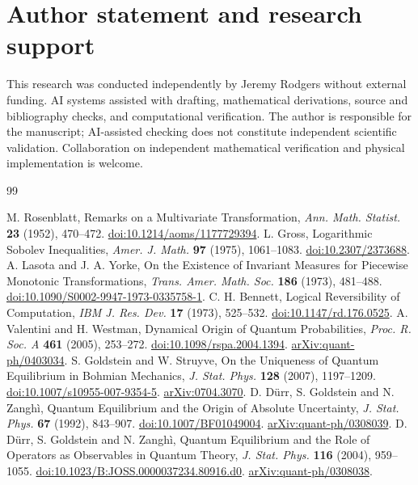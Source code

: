 \documentclass[11pt]{article}
\numberwithin{equation}{section}
\theoremstyle{definition}
\theoremstyle{remark}
\begin{document}
\section*{Author statement and research support}
This research was conducted independently by Jeremy Rodgers without external funding. AI systems assisted with drafting, mathematical derivations, source and bibliography checks, and computational verification. The author is responsible for the manuscript; AI-assisted checking does not constitute independent scientific validation. Collaboration on independent mathematical verification and physical implementation is welcome.

\begin{thebibliography}{99}
\raggedright
{} M. Rosenblatt, Remarks on a Multivariate Transformation, \emph{Ann. Math. Statist.} \textbf{23} (1952), 470--472. \href{https://doi.org/10.1214/aoms/1177729394}{doi:10.1214/aoms/1177729394}.
 L. Gross, Logarithmic Sobolev Inequalities, \emph{Amer. J. Math.} \textbf{97} (1975), 1061--1083. \href{https://doi.org/10.2307/2373688}{doi:10.2307/2373688}.
 A. Lasota and J. A. Yorke, On the Existence of Invariant Measures for Piecewise Monotonic Transformations, \emph{Trans. Amer. Math. Soc.} \textbf{186} (1973), 481--488. \href{https://doi.org/10.1090/S0002-9947-1973-0335758-1}{doi:10.1090/S0002-9947-1973-0335758-1}.
 C. H. Bennett, Logical Reversibility of Computation, \emph{IBM J. Res. Dev.} \textbf{17} (1973), 525--532. \href{https://doi.org/10.1147/rd.176.0525}{doi:10.1147/rd.176.0525}.
 A. Valentini and H. Westman, Dynamical Origin of Quantum Probabilities, \emph{Proc. R. Soc. A} \textbf{461} (2005), 253--272. \href{https://doi.org/10.1098/rspa.2004.1394}{doi:10.1098/rspa.2004.1394}. \href{https://arxiv.org/abs/quant-ph/0403034}{arXiv:quant-ph/0403034}.
 S. Goldstein and W. Struyve, On the Uniqueness of Quantum Equilibrium in Bohmian Mechanics, \emph{J. Stat. Phys.} \textbf{128} (2007), 1197--1209. \href{https://doi.org/10.1007/s10955-007-9354-5}{doi:10.1007/s10955-007-9354-5}. \href{https://arxiv.org/abs/0704.3070}{arXiv:0704.3070}.
 D. D\"urr, S. Goldstein and N. Zangh\`i, Quantum Equilibrium and the Origin of Absolute Uncertainty, \emph{J. Stat. Phys.} \textbf{67} (1992), 843--907. \href{https://doi.org/10.1007/BF01049004}{doi:10.1007/BF01049004}. \href{https://arxiv.org/abs/quant-ph/0308039}{arXiv:quant-ph/0308039}.
 D. D\"urr, S. Goldstein and N. Zangh\`i, Quantum Equilibrium and the Role of Operators as Observables in Quantum Theory, \emph{J. Stat. Phys.} \textbf{116} (2004), 959--1055. \href{https://doi.org/10.1023/B:JOSS.0000037234.80916.d0}{doi:10.1023/B:JOSS.0000037234.80916.d0}. \href{https://arxiv.org/abs/quant-ph/0308038}{arXiv:quant-ph/0308038}.

\end{thebibliography}
\end{document}
